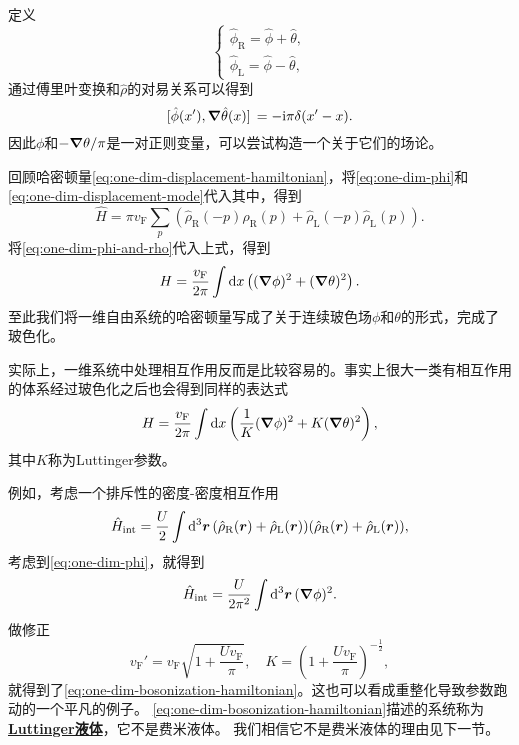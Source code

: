 \documentclass[hyperref, UTF8, a4paper]{ctexart}
\newcommand*{\ii}{\mathrm{i}}
\newcommand*{\concept}[1]{\underline{\textbf{#1}}}
\begin{document}
定义
\begin{equation}
    \begin{cases}
        \hat{\phi}_\text{R} = \hat{\phi} + \hat{\theta}, \\
        \hat{\phi}_\text{L} = \hat{\phi} - \hat{\theta},
    \end{cases}
\end{equation}
通过傅里叶变换和$\hat{\rho}$的对易关系可以得到
\begin{equation}
    \comm*{\hat{\phi}(x')}{\grad \hat{\theta}(x)} = -\ii \pi \delta(x' - x).
\end{equation}
因此$\phi$和$- \grad{\theta} / \pi$是一对正则变量，可以尝试构造一个关于它们的场论。

回顾哈密顿量\eqref{eq:one-dim-displacement-hamiltonian}，将\eqref{eq:one-dim-phi}和\eqref{eq:one-dim-displacement-mode}代入其中，得到
\[
    \hat{H} = \pi v_\text{F} \sum_p \left( \hat{\rho}_\text{R}(-p) \hat{\rho}_\text{R}(p) + \hat{\rho}_\text{L}(-p) \hat{\rho}_\text{L}(p) \right).
\]
将\eqref{eq:one-dim-phi-and-rho}代入上式，得到
\begin{equation}
    H = \frac{v_\text{F}}{2\pi} \int \dd{x} \left( (\grad{\phi})^2 + (\grad{\theta})^2 \right).
\end{equation}
至此我们将一维自由系统的哈密顿量写成了关于连续玻色场$\phi$和$\theta$的形式，完成了玻色化。

实际上，一维系统中处理相互作用反而是比较容易的。事实上很大一类有相互作用的体系经过玻色化之后也会得到同样的表达式
\begin{equation}
    H = \frac{v_\text{F}}{2\pi} \int \dd{x} \left( \frac{1}{K} (\grad{\phi})^2 + K (\grad{\theta})^2 \right),
    \label{eq:one-dim-bosonization-hamiltonian}
\end{equation}
其中$K$称为Luttinger参数。

例如，考虑一个排斥性的密度-密度相互作用
\begin{equation}
    \hat{H}_\text{int} = \frac{U}{2} \int \dd[3]{\vb*{r}} (\hat{\rho}_\text{R}(\vb*{r}) + \hat{\rho}_\text{L}(\vb*{r})) (\hat{\rho}_\text{R}(\vb*{r}) + \hat{\rho}_\text{L}(\vb*{r})),
\end{equation}
考虑到\eqref{eq:one-dim-phi}，就得到
\begin{equation}
    \hat{H}_\text{int} = \frac{U}{2\pi^2} \int \dd[3]{\vb*{r}} (\grad{\phi})^2.
\end{equation}
做修正
\begin{equation}
    v_\text{F}' = v_\text{F} \sqrt{1 + \frac{U v_\text{F}}{\pi}}, \quad K = \left( 1 + \frac{U v_\text{F}}{\pi} \right)^{- \frac{1}{2}},
\end{equation}
就得到了\eqref{eq:one-dim-bosonization-hamiltonian}。这也可以看成重整化导致参数跑动的一个平凡的例子。
\eqref{eq:one-dim-bosonization-hamiltonian}描述的系统称为\concept{Luttinger液体}，它不是费米液体。
我们相信它不是费米液体的理由见下一节。
\end{document}
